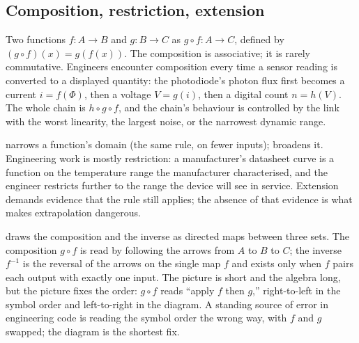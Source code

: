 \subsection{Composition, restriction, extension}

Two functions $f: A \to B$ and $g: B \to C$  as
$g \circ f: A \to C$, defined by $(g \circ f)(x) = g(f(x))$. The
composition is associative; it is rarely commutative. Engineers
encounter composition every time a sensor reading is converted to a
displayed quantity: the photodiode's photon flux first becomes a
current $i = f(\Phi)$, then a voltage $V = g(i)$, then a digital
count $n = h(V)$. The whole chain is $h \circ g \circ f$, and the
chain's behaviour is controlled by the link with the worst
linearity, the largest noise, or the narrowest dynamic range.

 narrows a function's domain (the same rule, on
fewer inputs);  broadens it. Engineering work is
mostly restriction: a manufacturer's datasheet curve is a function on
the temperature range the manufacturer characterised, and the engineer
restricts further to the range the device will see in service.
Extension demands evidence that the rule still applies; the absence
of that evidence is what makes extrapolation dangerous.



 draws the composition and
the inverse as directed maps between three sets. The composition
$g \circ f$ is read by following the arrows from $A$ to $B$ to $C$;
the inverse $f^{-1}$ is the reversal of the arrows on the single
map $f$ and exists only when $f$ pairs each output with exactly one
input. The picture is short and the algebra long, but the picture
fixes the order: $g \circ f$ reads ``apply $f$ then $g$,''
right-to-left in the symbol order and left-to-right in the diagram.
A standing source of error in engineering code is reading the symbol
order the wrong way, with $f$ and $g$ swapped; the diagram is the
shortest fix.

